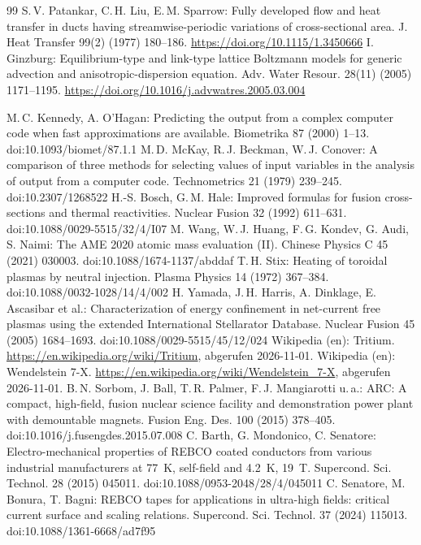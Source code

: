 \documentclass[10pt,a4paper]{article}
\begin{document}
\begin{thebibliography}{99}
 S.\,V. Patankar, C.\,H. Liu, E.\,M. Sparrow: Fully developed flow and heat transfer in ducts having streamwise-periodic variations of cross-sectional area. J. Heat Transfer 99(2) (1977) 180--186. \url{https://doi.org/10.1115/1.3450666}
 I. Ginzburg: Equilibrium-type and link-type lattice Boltzmann models for generic advection and anisotropic-dispersion equation. Adv. Water Resour. 28(11) (2005) 1171--1195. \url{https://doi.org/10.1016/j.advwatres.2005.03.004}

 M.\,C. Kennedy, A. O'Hagan: Predicting the output from a complex computer code when fast
  approximations are available. Biometrika 87 (2000) 1--13. doi:10.1093/biomet/87.1.1
 M.\,D. McKay, R.\,J. Beckman, W.\,J. Conover: A comparison of three methods for selecting values
  of input variables in the analysis of output from a computer code. Technometrics 21 (1979) 239--245. doi:10.2307/1268522
 H.-S. Bosch, G.\,M. Hale: Improved formulas for fusion cross-sections and thermal
  reactivities. Nuclear Fusion 32 (1992) 611--631. doi:10.1088/0029-5515/32/4/I07
 M. Wang, W.\,J. Huang, F.\,G. Kondev, G. Audi, S. Naimi: The AME 2020 atomic mass evaluation (II).
  Chinese Physics C 45 (2021) 030003. doi:10.1088/1674-1137/abddaf
 T.\,H. Stix: Heating of toroidal plasmas by neutral injection. Plasma Physics 14 (1972) 367--384.
  doi:10.1088/0032-1028/14/4/002
 H. Yamada, J.\,H. Harris, A. Dinklage, E. Ascasibar et al.: Characterization of energy confinement
  in net-current free plasmas using the extended International Stellarator Database. Nuclear Fusion 45 (2005)
  1684--1693. doi:10.1088/0029-5515/45/12/024
 Wikipedia (en): Tritium. \url{https://en.wikipedia.org/wiki/Tritium}, abgerufen 2026-11-01.
 Wikipedia (en): Wendelstein 7-X. \url{https://en.wikipedia.org/wiki/Wendelstein_7-X}, abgerufen 2026-11-01.
 B.\,N. Sorbom, J. Ball, T.\,R. Palmer, F.\,J. Mangiarotti u.\,a.: ARC: A compact, high-field, fusion nuclear science facility and demonstration power plant with demountable magnets. Fusion Eng. Des. 100 (2015) 378--405. doi:10.1016/j.fusengdes.2015.07.008
 C. Barth, G. Mondonico, C. Senatore: Electro-mechanical properties of REBCO coated conductors from various industrial manufacturers at 77~K, self-field and 4.2~K, 19~T. Supercond. Sci. Technol. 28 (2015) 045011. doi:10.1088/0953-2048/28/4/045011
 C. Senatore, M. Bonura, T. Bagni: REBCO tapes for applications in ultra-high fields: critical current surface and scaling relations. Supercond. Sci. Technol. 37 (2024) 115013. doi:10.1088/1361-6668/ad7f95

\end{thebibliography}
\end{document}
